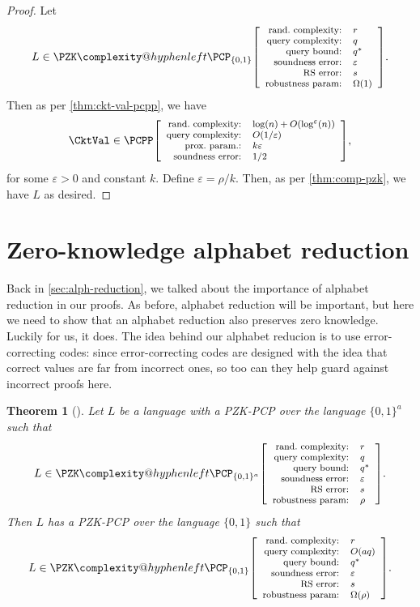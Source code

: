 \documentclass[english,12pt]{reedthesis}
\makeatletter
\theoremstyle{plain}
\newtheorem{thm}{Theorem}[section]
\theoremstyle{definition}
\theoremstyle{remark}
\newcommand{\pcpp}[4]{%
  \ensuremath%
  \mleft[{\footnotesize\begin{array}{r l}
    \text{rand.\ complexity:} & #1 \\
    \text{query complexity:} & #2 \\
    \text{prox.\ param.:} & #3 \\
    \text{soundness error:} & #4
  \end{array}}\mright]%
}
\newcommand{\pzkpcpr}[6]{%
  \ensuremath%
  \mleft[{\footnotesize\begin{array}{r l}
    \text{rand.\ complexity:} & #1 \\
    \text{query complexity:} & #2 \\
    \text{query bound:} & #3 \\
    \text{soundness error:} & #4 \\
    \text{RS error:} & #5 \\
    \text{robustness param:} & #6
  \end{array}}\mright]%
}
\newcommand{\PZKPCP}{%
  \PZK\complexity@hyphenleft\PCP
}
\makeatother
\begin{document}
\begin{proof}
  Let
  \begin{equation}
    L \in \PZKPCP_{\{0, 1\}}\pzkpcpr{r}{q}{q^{*}}{\varepsilon}{s}{\Omega(1)}.
  \end{equation}
  Then as per \cref{thm:ckt-val-pcpp}, we have
  \begin{equation}
    \CktVal \in \PCPP\pcpp{\log(n) + O(\log^{\varepsilon}(n))}{O(1/\varepsilon)}{k\varepsilon}{1/2},
  \end{equation}
  for some $\varepsilon > 0$ and constant $k$. Define $\varepsilon = \rho/k$. Then, as per
  \cref{thm:comp-pzk}, we have $L$ as desired.
\end{proof}

\section{Zero-knowledge alphabet reduction}\label{sec:zk-alph-red}

Back in \cref{sec:alph-reduction}, we talked about the importance of alphabet
reduction in our proofs. As before, alphabet reduction will be important, but
here we need to show that an alphabet reduction also preserves zero knowledge.
Luckily for us, it does. The idea behind our alphabet reducion is to use
error-correcting codes: since error-correcting codes are designed with the idea
that correct values are far from incorrect ones, so too can they help guard
against incorrect proofs here.

\begin{thm}[{\cite[Lemma 2.13]{BGHSV06}}]%
  \label{thm:zk-alph-red}\label{alphabet reduction!zero-knowledge}
  Let $L$ be a language with a PZK-PCP over the language $\{0, 1\}^{a}$ such
  that
  \[
    L \in \PZKPCP_{\{0,1\}^{a}}\pzkpcpr{r}{q}{q^{*}}{\varepsilon}{s}{\rho}.
  \]
  Then $L$ has a PZK-PCP over the language $\{0, 1\}$ such that
  \[
    L \in \PZKPCP_{\{0,1\}}\pzkpcpr{r}{O(aq)}{q^{*}}{\varepsilon}{s}{\Omega(\rho)}.
  \]
\end{thm}
\end{document}
